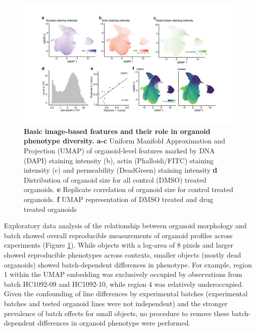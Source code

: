 \begin{flushleft}
\begin{figure}[h]
\centering
\includegraphics[width=\textwidth,
                height=\textheight,
                keepaspectratio]{figures/promise/pdf/fig_1_5.pdf}
\caption{\textbf{Basic image-based features and their role in organoid phenotype diversity. a-c} Uniform Manifold Approximation and Projection (UMAP) of organoid-level features marked by DNA (DAPI) staining intensity (b), actin (Phalloidi/FITC) staining intensity (c) and permeability (DeadGreen) staining intensity \textbf{d} Distribution of organoid size for all control (DMSO) treated organoids. \textbf{e} Replicate correlation of organoid size for control treated organoids. \textbf{f} UMAP representation of DMSO treated and drug treated organoids}
\label{fig_145}
\end{figure}
\bigbreak

Exploratory data analysis of the relationship between organoid morphology and batch showed overall reproducible measurements of organoid profiles across experiments (Figure \ref{fig_145}). While objects with a log-area of 8 pixels and larger showed reproducible phenotypes across contexts, smaller objects (mostly dead organoids) showed batch-dependent differences in phenotype. For example, region 1 within the UMAP embedding was exclusively occupied by observations from batch HC1092-09 and HC1092-10, while region 4 was relatively underoccupied. Given the confounding of line differences by experimental batches (experimental batches and tested organoid lines were not independent) and the stronger prevalence of batch effects for small objects, no procedure to remove these batch-dependent differences in organoid phenotype were performed. 

\bigbreak


\end{flushleft}
